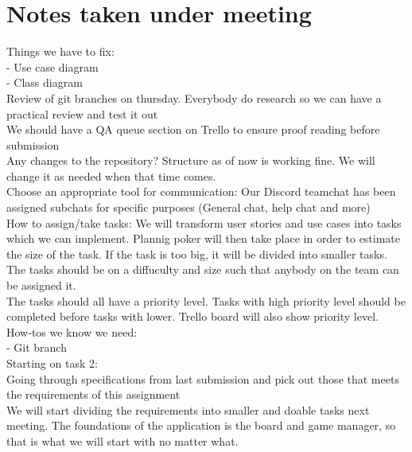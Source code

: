 \documentclass[letterpaper,11pt]{article}
\begin{document}
\section*{Notes taken under meeting}
Things we have to fix:\\
- Use case diagram\\
- Class diagram\\

Review of git branches on thursday. Everybody do research so we can have a practical review and test it out\\
We should have a QA queue section on Trello to ensure proof reading before submission\\
Any changes to the repository? Structure as of now is working fine. We will change it as needed when that time comes.\\
Choose an appropriate tool for communication: Our Discord teamchat has been assigned subchats for specific purposes (General chat, help chat and more)\\
How to assign/take tasks: We will transform user stories and use cases into tasks which we can implement. Plannig poker will then take place in order to estimate the size of the task. If the task is too big, it will be divided into smaller tasks. The tasks should be on a diffuculty and size such that anybody on the team can be assigned it.\\
The tasks should all have a priority level. Tasks with high priority level should be completed before tasks with lower. Trello board will also show priority level.\\
How-tos we know we need:\\
- Git branch\\
Starting on task 2:\\
Going through specifications from last submission and pick out those that meets the requirements of this assignment\\
We will start dividing the requirements into smaller and doable tasks next meeting. The foundations of the application is the board and game manager, so that is what we will start with no matter what.\\
\end{document}

